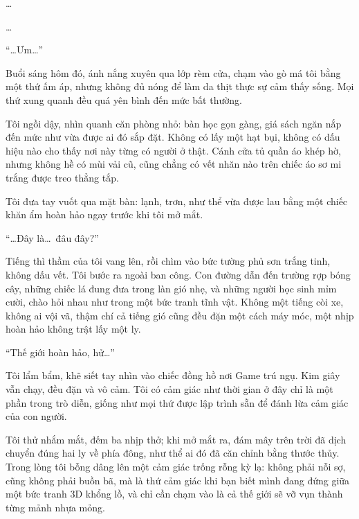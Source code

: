 \documentclass[../main.tex]{subfiles}
\begin{document}


\dots

\dots

``\dots Ưm\dots''

Buổi sáng hôm đó, ánh nắng xuyên qua lớp rèm cửa, chạm vào gò má tôi bằng một thứ ấm áp, nhưng không đủ nóng để làm da thịt thực sự cảm thấy sống. Mọi thứ xung quanh đều quá yên bình đến mức bất thường.

Tôi ngồi dậy, nhìn quanh căn phòng nhỏ: bàn học gọn gàng, giá sách ngăn nắp đến mức như vừa được ai đó sắp đặt. Không có lấy một hạt bụi, không có dấu hiệu nào cho thấy nơi này từng có người ở thật. Cánh cửa tủ quần áo khép hờ, nhưng không hề có mùi vải cũ, cũng chẳng có vết nhăn nào trên chiếc áo sơ mi trắng được treo thẳng tắp.

Tôi đưa tay vuốt qua mặt bàn: lạnh, trơn, như thể vừa được lau bằng một chiếc khăn ẩm hoàn hảo ngay trước khi tôi mở mắt.

``\dots Đây là\dots\ đâu đây?''

Tiếng thì thầm của tôi vang lên, rồi chìm vào bức tường phủ sơn trắng tinh, không dấu vết. Tôi bước ra ngoài ban công. Con đường dẫn đến trường rợp bóng cây, những chiếc lá đung đưa trong làn gió nhẹ, và những người học sinh mỉm cười, chào hỏi nhau như trong một bức tranh tĩnh vật. Không một tiếng còi xe, không ai vội vã, thậm chí cả tiếng gió cũng đều đặn một cách máy móc, một nhịp hoàn hảo không trật lấy một ly.

``Thế giới hoàn hảo, hử\dots''

Tôi lẩm bẩm, khẽ siết tay nhìn vào chiếc đồng hồ nơi Game trú ngụ. Kim giây vẫn chạy, đều đặn và vô cảm. Tôi có cảm giác như thời gian ở đây chỉ là một phần trong trò diễn, giống như mọi thứ được lập trình sẵn để đánh lừa cảm giác của con người.

Tôi thử nhắm mắt, đếm ba nhịp thở; khi mở mắt ra, đám mây trên trời đã dịch chuyển đúng hai ly về phía đông, như thể ai đó đã căn chỉnh bằng thước thủy. Trong lòng tôi bỗng dâng lên một cảm giác trống rỗng kỳ lạ: không phải nỗi sợ, cũng không phải buồn bã, mà là thứ cảm giác khi bạn biết mình đang đứng giữa một bức tranh 3D khổng lồ, và chỉ cần chạm vào là cả thế giới sẽ vỡ vụn thành từng mảnh nhựa mỏng.
\end{document}
